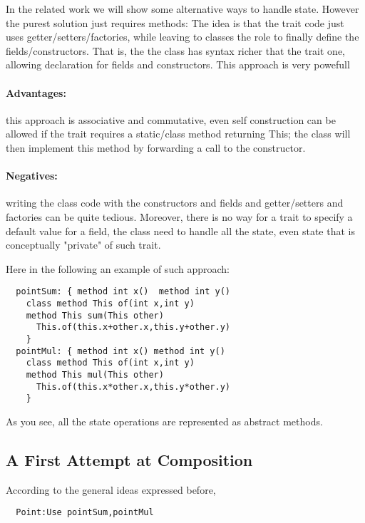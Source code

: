 In the related work we will show some alternative ways to handle state.
However the purest solution just requires methods:
  The idea is that
  the trait code just uses getter/setters/factories, while leaving
  to classes the role to finally define the fields/constructors.
  That is, the  the class has syntax richer that the trait one,
  allowing declaration for fields and constructors.
  This approach is very powefull~\cite{wang2016classless}
 
\paragraph*{Advantages:} 
this approach is associative and commutative, even self construction
  can be allowed if the trait requires a static/class method
  returning This; the class will then implement this method by forwarding
  a call to the constructor.
  
\paragraph*{Negatives:} writing the class code with the constructors and
   fields and getter/setters and factories can be quite tedious.
   Moreover, there is no way for a trait to specify a default value for a field,
   the class need to handle all the state, even state that is conceptually
   "private" of such trait.

Here in the following an example of such approach:

\begin{lstlisting}
  pointSum: { method int x()  method int y()
    class method This of(int x,int y)
    method This sum(This other)
      This.of(this.x+other.x,this.y+other.y)
    }
  pointMul: { method int x() method int y()
    class method This of(int x,int y)
    method This mul(This other)
      This.of(this.x*other.x,this.y*other.y)
    }
\end{lstlisting}

As you see, all the state operations are represented as abstract methods.

\subsection{A First Attempt at Composition}
According to the general ideas expressed before,
\begin{lstlisting}
  Point:Use pointSum,pointMul
\end{lstlisting}  

